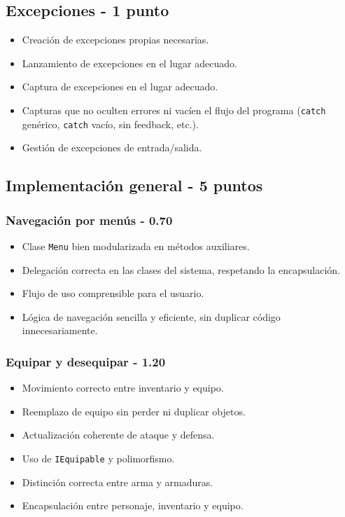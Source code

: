 \documentclass[10pt,a4paper]{article}
\begin{document}
\subsection{Excepciones - 1 punto}
\begin{itemize}
    \item Creación de excepciones propias necesarias.
    \item Lanzamiento de excepciones en el lugar adecuado.
    \item Captura de excepciones en el lugar adecuado.
    \item Capturas que no oculten errores ni vacíen el flujo del programa (\texttt{catch} genérico, \texttt{catch} vacío, sin feedback, etc.).
    \item Gestión de excepciones de entrada/salida.
\end{itemize}

\subsection{Implementación general - 5 puntos}
\subsubsection{Navegación por menús - 0.70}
\begin{itemize}
    \item Clase \texttt{Menu} bien modularizada en métodos auxiliares.
    \item Delegación correcta en las clases del sistema, respetando la encapsulación.
    \item Flujo de uso comprensible para el usuario.
    \item Lógica de navegación sencilla y eficiente, sin duplicar código innecesariamente.
\end{itemize}
\subsubsection{Equipar y desequipar - 1.20}
\begin{itemize}
    \item Movimiento correcto entre inventario y equipo.
    \item Reemplazo de equipo sin perder ni duplicar objetos.
    \item Actualización coherente de ataque y defensa.
    \item Uso de \texttt{IEquipable} y polimorfismo.
    \item Distinción correcta entre arma y armaduras.
    \item Encapsulación entre personaje, inventario y equipo.
\end{itemize}
\end{document}
